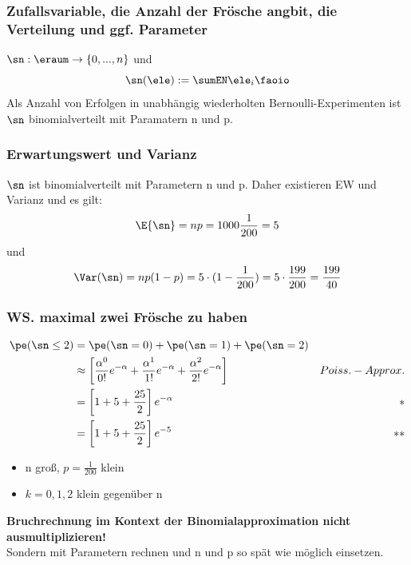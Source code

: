 \begin{auf}
    \subsubsection*{Zufallsvariable, die Anzahl der Frösche angbit, die Verteilung und ggf. Parameter}
    $\sn: \eraum \rightarrow \{ 0, ..., n \}$ und
    \[
        \sn(\ele) := \sumEN \ele_i \faoio
    \]
    Als Anzahl von Erfolgen in unabhängig wiederholten Bernoulli-Experimenten ist $\sn$ binomialverteilt mit
    Paramatern n und p.
\end{auf}


\begin{auf}
    \subsubsection*{Erwartungswert und Varianz}
    $\sn$ ist binomialverteilt mit Parametern n und p.
    Daher existieren EW und Varianz und es gilt:
    \[
        \E{\sn} = np  = 1000 \frac{1}{200} = 5
    \]
    und
    \[
        \Var(\sn) = np (1-p) = 5 \cdot (1 - \frac{1}{200}) = 5 \cdot \frac{199}{200} = \frac{199}{40}
    \]
\end{auf}


\begin{auf}
    \subsubsection*{WS. maximal zwei Frösche zu haben}
    \begin{align*}
        \pe(\sn \leq 2 ) & = \pe(\sn = 0) + \pe(\sn = 1) + \pe(\sn = 2) \\
        & \approx \left[  \frac{\alpha^0}{0!} e^{-\alpha} +  \frac{\alpha^1}{1!} e^{-\alpha} +  \frac{\alpha^2}{2!}
                      e^{-\alpha}  \right] & Poiss.-Approx. \\
        & = \left[  1+5 + \frac{25}{2} \right] e^{-\alpha} & * \\
        & =  \left[  1+5 + \frac{25}{2} \right] e^{-5} & ** \\
    \end{align*}
    \begin{itemize}
        \item[*] n groß, $p = \frac{1}{200}$ klein
        \item[**] $k = 0,1,2$ klein gegenüber n
    \end{itemize}
\end{auf}

\begin{bem}
    \textbf{Bruchrechnung im Kontext der Binomialapproximation nicht ausmultiplizieren!}  \\
    Sondern mit Parametern rechnen und n und p so spät wie möglich einsetzen.
\end{bem}



